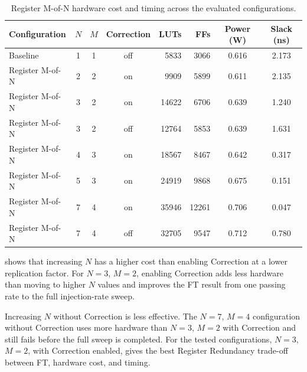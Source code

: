 \begin{table}[h]
\centering
\scriptsize
\setlength{\tabcolsep}{3.0pt}
\renewcommand{\arraystretch}{1.15}
\begin{tabularx}{\textwidth}{|>{\raggedright\arraybackslash}X|c|c|c|r|r|c|c|}
\hline
\rowcolor{tableheader}\textbf{Configuration} &
\textbf{$N$} &
\textbf{$M$} &
\textbf{Correction} &
\textbf{\acp{LUT}} &
\textbf{\acp{FF}} &
\textbf{Power (W)} &
\textbf{Slack (ns)} \\
\hline
\hline
\rowcolor{green!25}
Baseline &
1 &
1 &
off &
5833 &
3066 &
0.616 &
2.173 \\
\hline
\rowcolor{yellow!10}
Register M-of-N &
2 &
2 &
on &
9909 &
5899 &
0.611 &
2.135 \\
\hline
\rowcolor{yellow!10}
Register M-of-N &
3 &
2 &
on &
14622 &
6706 &
0.639 &
1.240 \\
\hline
\rowcolor{orange!20}
Register M-of-N &
3 &
2 &
off &
12764 &
5853 &
0.639 &
1.631 \\
\hline
\rowcolor{yellow!10}
Register M-of-N &
4 &
3 &
on &
18567 &
8467 &
0.642 &
0.317 \\
\hline
\rowcolor{yellow!10}
Register M-of-N &
5 &
3 &
on &
24919 &
9868 &
0.675 &
0.151 \\
\hline
\rowcolor{yellow!10}
Register M-of-N &
7 &
4 &
on &
35946 &
12261 &
0.706 &
0.047 \\
\hline
\rowcolor{orange!20}
Register M-of-N &
7 &
4 &
off &
32705 &
9547 &
0.712 &
0.780 \\
\hline
\end{tabularx}
\caption{Register M-of-N hardware cost and timing across the evaluated configurations.}
\label{tab:chap9-regRedundancy-cost}
\end{table}

 shows that increasing \(N\) has a higher cost than enabling Correction at a lower replication factor. For \(N=3\), \(M=2\), enabling Correction adds less hardware than moving to higher \(N\) values and improves the \ac{FT} result from one passing rate to the full injection-rate sweep.

Increasing \(N\) without Correction is less effective. The \(N=7\), \(M=4\) configuration without Correction uses more hardware than \(N=3\), \(M=2\) with Correction and still fails before the full sweep is completed. For the tested configurations, \(N=3\), \(M=2\), with Correction enabled, gives the best Register Redundancy trade-off between \ac{FT}, hardware cost, and timing.







